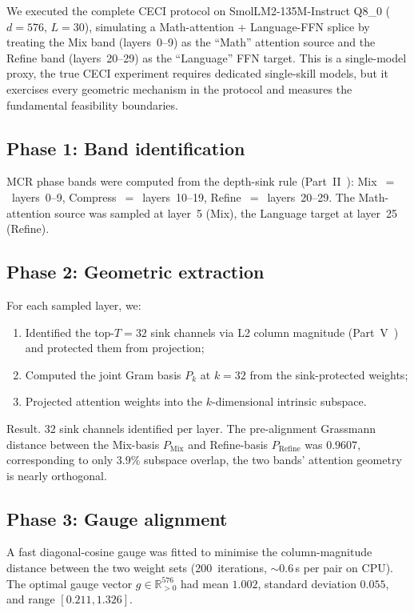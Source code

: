 \documentclass[11pt]{article}
\begin{document}
We executed the complete CECI protocol on SmolLM2-135M-Instruct Q8\_0
($d{=}576$, $L{=}30$), simulating a Math-attention + Language-FFN
splice by treating the Mix band (layers~0--9) as the ``Math'' attention
source and the Refine band (layers~20--29) as the ``Language'' FFN
target.  This is a single-model proxy, the true CECI experiment
requires dedicated single-skill models, but it exercises every
geometric mechanism in the protocol and measures the fundamental
feasibility boundaries.

\subsection{Phase 1: Band identification}

MCR phase bands were computed from the depth-sink rule
(Part~II~\cite{stewart2026gp}): Mix~$=$~layers~0--9,
Compress~$=$~layers~10--19, Refine~$=$~layers~20--29.  The
Math-attention source was sampled at layer~5 (Mix), the Language
target at layer~25 (Refine).

\subsection{Phase 2: Geometric extraction}

For each sampled layer, we:
\begin{enumerate}
\item Identified the top-$T{=}32$ sink channels via L2 column
      magnitude (Part~V~\cite{stewart2026distill}) and protected
      them from projection;
\item Computed the joint Gram basis $P_k$ at $k{=}32$ from the
      sink-protected weights;
\item Projected attention weights into the $k$-dimensional intrinsic
      subspace.
\end{enumerate}

Result.  32 sink channels identified per layer.  The
pre-alignment Grassmann distance between the Mix-basis $P_{\mathrm{Mix}}$
and Refine-basis $P_{\mathrm{Refine}}$ was $0.9607$,
corresponding to only $3.9\%$ subspace overlap, the two bands'
attention geometry is nearly orthogonal.

\subsection{Phase 3: Gauge alignment}

A fast diagonal-cosine gauge was fitted to minimise the column-magnitude
distance between the two weight sets (200~iterations, ${\sim}0.6$\,s per
pair on CPU).  The optimal gauge vector $g\in\mathbb{R}^{576}_{>0}$ had
mean $1.002$, standard deviation $0.055$, and range $[0.211, 1.326]$.
\end{document}
